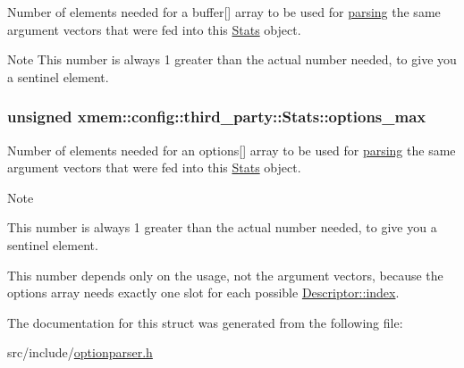 Number of elements needed for a {\ttfamily buffer}\mbox{[}\mbox{]} array to be used for \hyperlink{classxmem_1_1config_1_1third__party_1_1_parser_a0e45d97675bc5d003ef6f68ac8cd7249}{parsing} the same argument vectors that were fed into this \hyperlink{structxmem_1_1config_1_1third__party_1_1_stats}{Stats} object. 

\begin{DoxyNote}{Note}
This number is always 1 greater than the actual number needed, to give you a sentinel element. 
\end{DoxyNote}
\hypertarget{structxmem_1_1config_1_1third__party_1_1_stats_a74f645c06ae7eab5058f2a51226c2dcd}{}
\subsubsection[{options\+\_\+max}]{\setlength{\rightskip}{0pt plus 5cm}unsigned xmem\+::config\+::third\+\_\+party\+::\+Stats\+::options\+\_\+max}\label{structxmem_1_1config_1_1third__party_1_1_stats_a74f645c06ae7eab5058f2a51226c2dcd}


Number of elements needed for an {\ttfamily options}\mbox{[}\mbox{]} array to be used for \hyperlink{classxmem_1_1config_1_1third__party_1_1_parser_a0e45d97675bc5d003ef6f68ac8cd7249}{parsing} the same argument vectors that were fed into this \hyperlink{structxmem_1_1config_1_1third__party_1_1_stats}{Stats} object. 

\begin{DoxyNote}{Note}
\begin{DoxyItemize}
\item This number is always 1 greater than the actual number needed, to give you a sentinel element. \item This number depends only on the {\ttfamily usage}, not the argument vectors, because the {\ttfamily options} array needs exactly one slot for each possible \hyperlink{structxmem_1_1config_1_1third__party_1_1_descriptor_aacf3d44f35c61f22be65da078f60734b}{Descriptor\+::index}. \end{DoxyItemize}

\end{DoxyNote}


The documentation for this struct was generated from the following file\+:\begin{DoxyCompactItemize}
\item 
src/include/\hyperlink{optionparser_8h}{optionparser.\+h}\end{DoxyCompactItemize}
